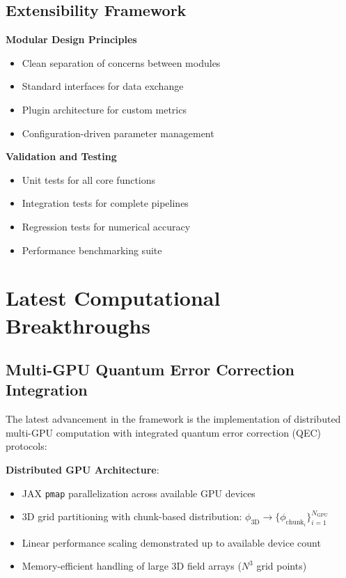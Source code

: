 \documentclass[11pt]{article}
\begin{document}
\subsection{Extensibility Framework}

\textbf{Modular Design Principles}
\begin{itemize}
\item Clean separation of concerns between modules
\item Standard interfaces for data exchange
\item Plugin architecture for custom metrics
\item Configuration-driven parameter management
\end{itemize}

\textbf{Validation and Testing}
\begin{itemize}
\item Unit tests for all core functions
\item Integration tests for complete pipelines
\item Regression tests for numerical accuracy
\item Performance benchmarking suite
\end{itemize}

\section{Latest Computational Breakthroughs}

\subsection{Multi-GPU Quantum Error Correction Integration}

The latest advancement in the framework is the implementation of distributed multi-GPU computation with integrated quantum error correction (QEC) protocols:

\textbf{Distributed GPU Architecture}:
\begin{itemize}
\item JAX \texttt{pmap} parallelization across available GPU devices
\item 3D grid partitioning with chunk-based distribution: $\phi_{\text{3D}} \to \{\phi_{\text{chunk}_i}\}_{i=1}^{N_{\text{GPU}}}$
\item Linear performance scaling demonstrated up to available device count
\item Memory-efficient handling of large 3D field arrays ($N^3$ grid points)
\end{itemize}
\end{document}
